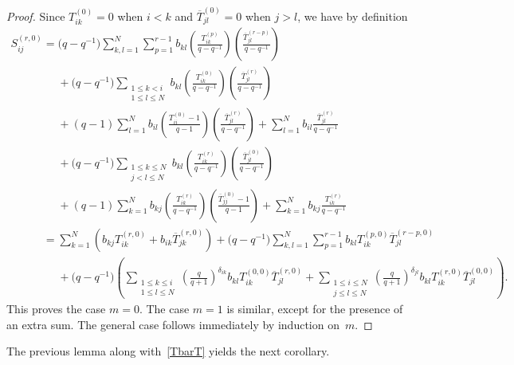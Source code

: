 \documentclass[pdftex]{sigma}
\numberwithin{theorem}{section}
\numberwithin{proposition}{section}
\numberwithin{lemma}{section}
\numberwithin{corollary}{section}
\numberwithin{definition}{section}
\numberwithin{example}{section}
\numberwithin{remark}{section}
\numberwithin{note}{section}
\numberwithin{equation}{section}
\begin{document}
\begin{proof}
Since $T_{ik}^{(0)}=0$ when $i<k$ and $\overline{T}_{jl}^{(0)}=0$ when $j>l$, we have by def\/inition
\begin{gather*}
S_{ij}^{(r,0)}= \big(q-q^{-1}\big) \sum\limits_{k,l=1}^N \sum\limits_{p=1}^{r-1} b_{kl} \left(\frac{T_{ik}^{(p)}}{q-q^{-1}}
\right) \left(\frac{\overline{T}_{jl}^{(r-p)}}{q-q^{-1}} \right)
\\
\phantom{S_{ij}^{(r,0)}=}{}
+ \big(q-q^{-1}\big)\sum\limits_{\substack{1 \leq k < i\\ 1 \leq l \leq N}} b_{kl} \left(\frac{T_{ik}^{(0)}}{q-q^{-1}} \right)
\left(\frac{\overline{T}_{jl}^{(r)}}{q-q^{-1}}\right)
\\
\phantom{S_{ij}^{(r,0)}=}{}
+ (q-1) \sum\limits_{l=1}^N b_{il} \left(\frac{T_{ii}^{(0)}-1}{q-1} \right)
\left(\frac{\overline{T}_{jl}^{(r)}}{q-q^{-1}}\right) + \sum\limits_{l=1}^N b_{il}
\frac{\overline{T}_{jl}^{(r)}}{q-q^{-1}}
\\
\phantom{S_{ij}^{(r,0)}=}{}
+ \big(q-q^{-1}\big) \sum\limits_{\substack{1 \leq k \leq N\\ j < l \leq N}} b_{kl} \left(\frac{T_{ik}^{(r)}}{q-q^{-1}} \right)
\left(\frac{\overline{T}_{jl}^{(0)}}{q-q^{-1}}\right)
\\
\phantom{S_{ij}^{(r,0)}=}{}
+ (q-1) \sum\limits_{k=1}^N b_{kj} \left(\frac{T_{ik}^{(r)}}{q-q^{-1}} \right)
\left(\frac{\overline{T}_{jj}^{(0)}-1}{q-1}\right) + \sum\limits_{k=1}^N b_{kj} \frac{T_{ik}^{(r)}}{q-q^{-1}}
\\
\phantom{S_{ij}^{(r,0)}}{}
= \sum\limits_{k=1}^N \left(b_{kj} T_{ik}^{(r,0)} + b_{ik} \overline{T}_{jk}^{(r,0)} \right) + \big(q-q^{-1}\big)
\sum\limits_{k,l=1}^N \sum\limits_{p=1}^{r-1} b_{kl} T_{ik}^{(p,0)} \overline{T}_{jl}^{(r-p,0)}
\\
\phantom{S_{ij}^{(r,0)}=}{}
+ \big(q-q^{-1}\big) \! \left(\sum\limits_{\substack{1 \leq k \leq i\\ 1 \leq l \leq N}}\! \left(\frac{q}{q+1}\right)^{\delta_{ik}}\!
b_{kl} T_{ik}^{(0,0)} \overline{T}_{jl}^{(r,0)} + \sum\limits_{\substack{1 \leq i \leq N\\ j \leq l \leq N}}\!
\left(\frac{q}{q+1}\right)^{\delta_{jl}} \! b_{kl} T_{ik}^{(r,0)} \overline{T}_{jl}^{(0,0)} \right).
\end{gather*}
This proves the case $m=0$.
The case $m=1$ is similar, except for the presence of an extra sum.
The general case follows immediately by induction on~$m$.
\end{proof}

The previous lemma along with~\eqref{TbarT} yields the next corollary.
\end{document}
